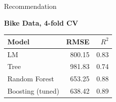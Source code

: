 \documentclass[10pt,compress,t,notes=noshow, xcolor=table]{beamer}
\begin{document}
\begin{frame}{Recommendation}

\centering \textbf{Bike Data, 4-fold CV}
\begin{table}[ht]
\centering
\begin{tabular}{lrr}
  \hline
Model & RMSE & $R^2$ \\ 
  \hline
  LM & 800.15 & 0.83 \\ 
  Tree & 981.83 & 0.74 \\ 
  Random Forest & 653.25 & 0.88 \\ 
  Boosting (tuned) & 638.42 & 0.89 \\ 
   \hline
\end{tabular}
\end{table}
\end{frame}



\endlecture
\end{document}
